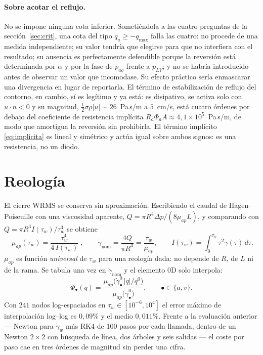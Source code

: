 \documentclass[11pt]{article}
\begin{document}
\paragraph{Sobre acotar el reflujo.} No se impone ninguna cota inferior.
Someti\'endola a las cuatro preguntas de la secci\'on~\ref{sec:crit}, una cota
del tipo $q_a\ge-q_{\max}$ falla las cuatro: no procede de una medida
independiente; su valor tendr\'ia que elegirse para que no interfiera con el
resultado; su ausencia es perfectamente defendible porque la reversi\'on est\'a
determinada por $\alpha$ y por la fase de $p_{ao}$ frente a $p_{LV}$; y no se
habr\'ia introducido antes de observar un valor que incomodase. Su efecto
pr\'actico ser\'ia enmascarar una divergencia en lugar de reportarla. El
t\'ermino de estabilizaci\'on de reflujo del contorno, en cambio, s\'i es
leg\'itimo y ya est\'a: es disipativo, se activa solo con $u\cdot n<0$ y su
magnitud, $\tfrac12\sigma\rho|u|\sim26$~Pa\,s/m a $5$~cm/s, est\'a cuatro
\'ordenes por debajo del coeficiente de resistencia impl\'icita
$R_a\Phi_a A\approx4{,}1\times10^{5}$~Pa\,s/m, de modo que amortigua la
reversi\'on sin prohibirla. El t\'ermino impl\'icito \eqref{eq:implicita} es
lineal y sim\'etrico y act\'ua igual sobre ambos signos: es una resistencia, no
un diodo.

\section{Reolog\'ia}
\label{sec:reo}

El cierre WRMS se conserva sin aproximaci\'on. Escribiendo el caudal de
Hagen--Poiseuille con una viscosidad aparente, $Q=\pi R^4\Delta p/(8\mu_{ap}L)$,
y comparando con $Q=\pi R^3 I(\tau_w)/\tau_w^3$ se obtiene
\begin{equation}
  \boxed{\;\mu_{ap}(\tau_w)=\frac{\tau_w^{4}}{4\,I(\tau_w)}\;},
  \qquad
  \dot\gamma_{\text{nom}}=\frac{4Q}{\pi R^{3}}=\frac{\tau_w}{\mu_{ap}},
  \qquad
  I(\tau_w)=\int_0^{\tau_w}\!\tau^2\dot\gamma(\tau)\,d\tau .
  \label{eq:muap}
\end{equation}
$\mu_{ap}$ es funci\'on \emph{universal} de $\tau_w$ para una reolog\'ia dada:
no depende de $R$, de $L$ ni de la rama. Se tabula una vez en
$\dot\gamma_{\text{nom}}$ y el elemento 0D solo interpola:
\begin{equation}
  \Phi_\bullet(q)=\frac{\mu_{ap}\bigl(\dot\gamma_\bullet^{0}\,|q|/q^{0}\bigr)}
                       {\mu_{ap}\bigl(\dot\gamma_\bullet^{0}\bigr)},
  \qquad \bullet\in\{a,v\}.
  \label{eq:phi}
\end{equation}
Con $241$ nodos log-espaciados en $\tau_w\in[10^{-6},10^{4}]$ el error m\'aximo
de interpolaci\'on log--log es $0{,}09\%$ y el medio $0{,}011\%$. Frente a la
evaluaci\'on anterior --- Newton para $\dot\gamma_w$ m\'as RK4 de $100$ pasos
por cada llamada, dentro de un Newton $2\times2$ con b\'usqueda de l\'inea, dos
\'arboles y seis salidas --- el coste por paso cae en tres \'ordenes de
magnitud sin perder una cifra.
\end{document}

